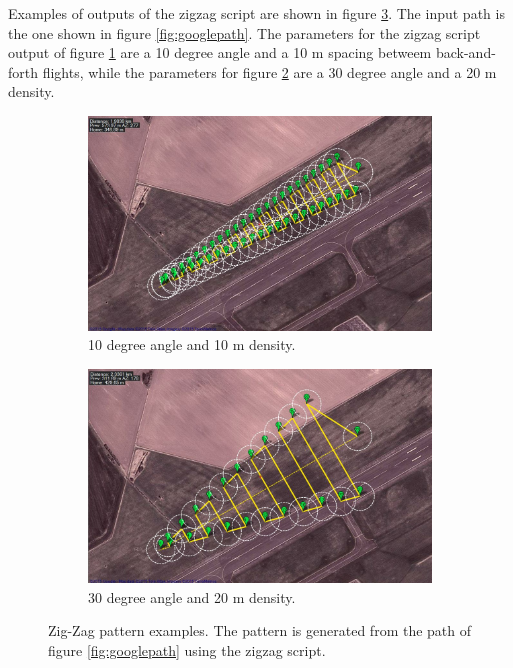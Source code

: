 Examples of outputs of the zigzag script are shown in figure \ref{fig:apmpath}. The input path is
the one shown in figure \ref{fig:googlepath}.
The parameters for the zigzag script output of figure \ref{fig:apmpath1} are a 10 degree angle and a
10 m spacing betweem back-and-forth flights, while the parameters for figure \ref{fig:apmpath2} are
a 30 degree angle and a 20 m density.
\begin{figure}[ht]
\centering
  \begin{subfigure}[t]{0.45\textwidth}
    \includegraphics[width = \textwidth]{Images/apmpath10}
    \caption{10 degree angle and 10 m density.}
    \label{fig:apmpath1}
  \end{subfigure}
  \begin{subfigure}[t]{0.45\textwidth}
    \includegraphics[width = \textwidth]{Images/apmpath30}
    \caption{30 degree angle and 20 m density.}
    \label{fig:apmpath2}
  \end{subfigure}  
\caption[Zig-Zag pattern examples.]
{Zig-Zag pattern examples. The pattern is generated from the path of figure \ref{fig:googlepath}
using the zigzag script.}
\label{fig:apmpath}
\end{figure}


